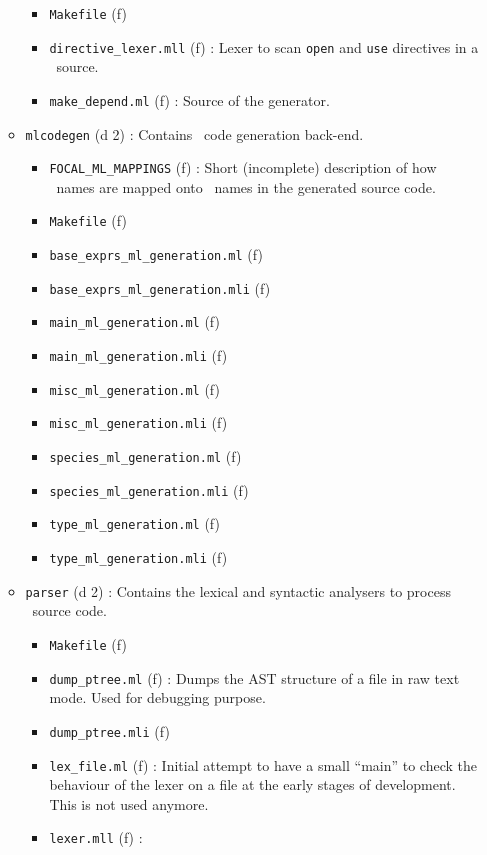 \begin{itemize}
\begin{itemize}
    \begin{itemize}
    \item {\tt Makefile} (f)
    \item {\tt directive\_lexer.mll} (f) : Lexer to scan {\tt open}
      and {\tt use} directives in a \focalize\ source.
    \item {\tt make\_depend.ml} (f) : Source of the generator.
    \end{itemize}
  \item {\tt mlcodegen} (d 2) : Contains \ocaml\ code generation back-end.
    \begin{itemize}
    \item {\tt FOCAL\_ML\_MAPPINGS} (f) : Short (incomplete) description
      of how \focalize\ names are mapped onto \ocaml\ names in the
      generated source code.
    \item {\tt Makefile} (f)
    \item {\tt base\_exprs\_ml\_generation.ml} (f)
    \item {\tt base\_exprs\_ml\_generation.mli} (f)
    \item {\tt main\_ml\_generation.ml} (f)
    \item {\tt main\_ml\_generation.mli} (f)
    \item {\tt misc\_ml\_generation.ml} (f)
    \item {\tt misc\_ml\_generation.mli} (f)
    \item {\tt species\_ml\_generation.ml} (f)
    \item {\tt species\_ml\_generation.mli} (f)
    \item {\tt type\_ml\_generation.ml} (f)
    \item {\tt type\_ml\_generation.mli} (f)
    \end{itemize}
  \item {\tt parser} (d 2) : Contains the lexical and syntactic
    analysers to process \focalize\ source code.
    \begin{itemize}
    \item {\tt Makefile} (f)
    \item {\tt dump\_ptree.ml} (f) : Dumps the AST structure of a file
      in raw text mode. Used for debugging purpose.
    \item {\tt dump\_ptree.mli} (f)
    \item {\tt lex\_file.ml} (f) : Initial attempt to have a small
      ``main'' to check the behaviour of the lexer on a file at the
      early stages of development. This is not used anymore.
    \item {\tt lexer.mll} (f) : 

\end{itemize}
\end{itemize}
\end{itemize}
